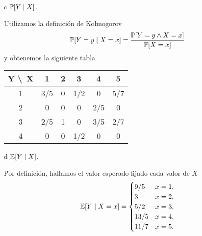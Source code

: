 \begin{statement}{c}
  $\mathbb{P}[Y \mid X]$.
\end{statement}

\begin{solution}
  Utilizamos la definici\'on de Kolmogorov
  \[
    \mathbb{P}[Y = y \mid X = x] = \frac{\mathbb{P}[Y = y \wedge X = x]}{\mathbb{P}[X = x]}
  \]
  y obtenemos la siguiente tabla
  \begin{center}
    \begin{tabular}{ | c | c | c | c | c | c | }
      \hline
      Y \textbackslash \, X & 1 & 2 & 3 & 4 & 5 \\ \hline
      1 & 3/5 & 0 & 1/2 & 0 & 5/7 \\ \hline
      2 & 0 & 0 & 0 & 2/5 & 0 \\ \hline
      3 & 2/5 & 1 & 0 & 3/5 & 2/7 \\ \hline
      4 & 0 & 0 & 1/2 & 0 & 0 \\
      \hline
    \end{tabular}
  \end{center}
\end{solution}

\begin{statement}{d}
  $\mathbb{E}[Y \mid X]$.
\end{statement}

\begin{solution}
  Por definici\'on, hallamos el valor esperado fijado cada valor de $X$
  \[
    \mathbb{E}[Y \mid X = x] = \begin{cases}
      9/5 & x = 1,\\
      3 & x = 2,\\
      5/2 & x = 3,\\
      13/5 & x = 4,\\
      11/7 & x = 5.
    \end{cases}  
  \]
\end{solution}